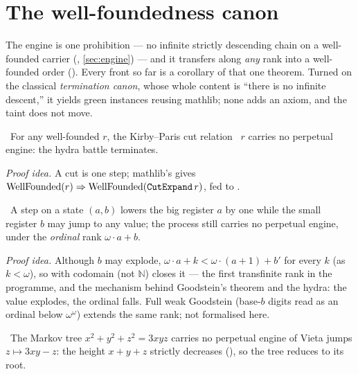 \section{The well-foundedness canon}\label{sec:wellfounded}

The engine is one prohibition --- no infinite strictly descending chain on a well-founded carrier
(, \cref{sec:engine}) --- and it transfers along
\emph{any} rank into a well-founded order (). Every front so far
is a corollary of that one theorem. Turned on the classical \emph{termination canon}, whose whole
content is ``there is no infinite descent,'' it yields green instances reusing mathlib; none adds an
axiom, and the taint does not move.

\begin{theorem}\label{thm:hydra_no_perpetual_engine}
\green{}\ For any well-founded $r$, the Kirby--Paris cut relation ~$r$ carries
no perpetual engine: the hydra battle terminates. 
\end{theorem}

\emph{Proof idea.} A cut is one  step; mathlib's  gives
$\mathrm{WellFounded}(r) \Rightarrow \mathrm{WellFounded}(\texttt{CutExpand}\,r)$, fed to
.

\begin{theorem}\label{thm:omega_worm_no_perpetual_engine}
\green{}\ A step on a state $(a,b)$ lowers the big register $a$ by one while the small register $b$ may
jump to any value; the process still carries no perpetual engine, under the \emph{ordinal} rank
$\omega\cdot a + b$. 
\end{theorem}

\emph{Proof idea.} Although $b$ may explode, $\omega\cdot a + k < \omega\cdot(a+1) + b'$ for every $k$
(as $k < \omega$), so  with codomain  (not
$\mathbb{N}$) closes it --- the first transfinite rank in the programme, and the mechanism behind
Goodstein's theorem and the hydra: the value explodes, the ordinal falls. Full weak Goodstein (base-$b$
digits read as an ordinal below $\omega^\omega$) extends the same rank; not formalised here.

\begin{theorem}\label{thm:markov_no_perpetual_engine}
\green{}\ The Markov tree $x^2+y^2+z^2=3xyz$ carries no perpetual engine of Vieta jumps
$z \mapsto 3xy-z$: the height $x+y+z$ strictly decreases (), so the tree
reduces to its root. 
\end{theorem}

